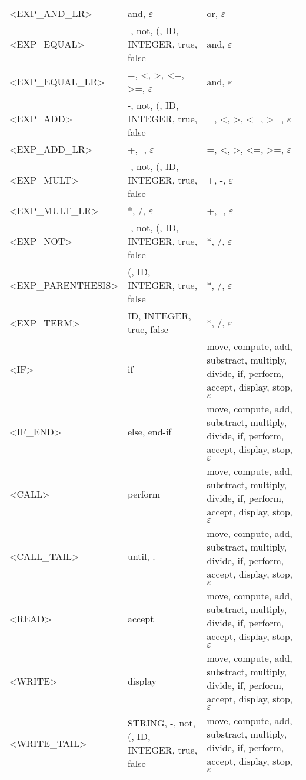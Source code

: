 \documentclass[a4paper,11pt]{article}
\begin{document}
\begin{longtable}{l>{\raggedright}p{6cm}p{6cm}}
	<EXP\_AND\_LR> & and, $\varepsilon$ & or, $\varepsilon$ \\
	<EXP\_EQUAL> & -, not, (, ID, INTEGER, true, false & and, $\varepsilon$ \\
	<EXP\_EQUAL\_LR> & =, <, >, <=, >=, $\varepsilon$ & and, $\varepsilon$ \\
	<EXP\_ADD> & -, not, (, ID, INTEGER, true, false & =, <, >, <=, >=, $\varepsilon$ \\
	<EXP\_ADD\_LR> & +, -, $\varepsilon$ & =, <, >, <=, >=, $\varepsilon$ \\
	<EXP\_MULT> & -, not, (, ID, INTEGER, true, false & +, -, $\varepsilon$ \\
	<EXP\_MULT\_LR> & *, /, $\varepsilon$ & +, -, $\varepsilon$ \\
	<EXP\_NOT> & -, not, (, ID, INTEGER, true, false & *, /, $\varepsilon$ \\
	<EXP\_PARENTHESIS> & (, ID, INTEGER, true, false & *, /, $\varepsilon$ \\
	<EXP\_TERM> & ID, INTEGER, true, false & *, /, $\varepsilon$ \\
	<IF> & if & move, compute, add, substract, multiply, divide, if, perform, accept, display, stop, $\varepsilon$ \\
	<IF\_END> & else, end-if & move, compute, add, substract, multiply, divide, if, perform, accept, display, stop, $\varepsilon$ \\
	<CALL> & perform & move, compute, add, substract, multiply, divide, if, perform, accept, display, stop, $\varepsilon$ \\
	<CALL\_TAIL> & until, . & move, compute, add, substract, multiply, divide, if, perform, accept, display, stop, $\varepsilon$ \\
	<READ> & accept & move, compute, add, substract, multiply, divide, if, perform, accept, display, stop, $\varepsilon$ \\
	<WRITE> & display & move, compute, add, substract, multiply, divide, if, perform, accept, display, stop, $\varepsilon$ \\
	<WRITE\_TAIL> & STRING, -, not, (, ID, INTEGER, true, false & move, compute, add, substract, multiply, divide, if, perform, accept, display, stop, $\varepsilon$ \\

\end{longtable}
\end{document}
